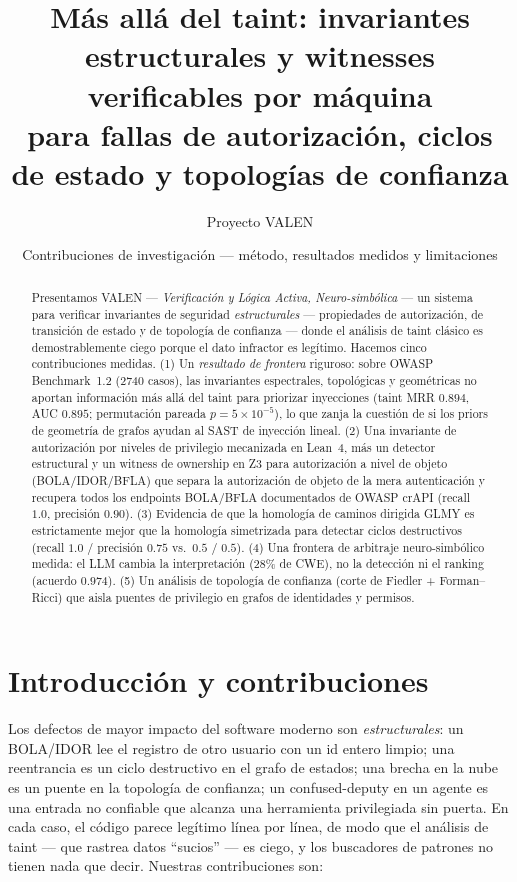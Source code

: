 \documentclass[11pt]{article}
\title{\bfseries Más allá del taint: invariantes estructurales y witnesses
verificables por máquina\\ para fallas de autorización, ciclos de estado y
topologías de confianza}
\author{Proyecto VALEN}
\date{Contribuciones de investigación --- método, resultados medidos y limitaciones}
\begin{document}
\maketitle

\begin{abstract}
\noindent Presentamos VALEN --- \emph{Verificación y Lógica Activa,
Neuro-simbólica} --- un sistema para verificar invariantes de seguridad
\emph{estructurales} --- propiedades de autorización, de transición de estado y de
topología de confianza --- donde el análisis de taint clásico es demostrablemente
ciego porque el dato infractor es legítimo. Hacemos cinco contribuciones medidas.
(1) Un \emph{resultado de frontera} riguroso: sobre OWASP Benchmark~1.2 (2740
casos), las invariantes espectrales, topológicas y geométricas no aportan
información más allá del taint para priorizar inyecciones (taint MRR $0.894$, AUC
$0.895$; permutación pareada $p=5\times10^{-5}$), lo que zanja la cuestión de si
los priors de geometría de grafos ayudan al SAST de inyección lineal. (2) Una
invariante de autorización por niveles de privilegio mecanizada en Lean~4, más un
detector estructural y un witness de ownership en Z3 para autorización a nivel de
objeto (BOLA/IDOR/BFLA) que separa la autorización de objeto de la mera
autenticación y recupera todos los endpoints BOLA/BFLA documentados de OWASP
crAPI (recall $1.0$, precisión $0.90$). (3) Evidencia de que la homología de
caminos dirigida GLMY es estrictamente mejor que la homología simetrizada para
detectar ciclos destructivos (recall $1.0$ / precisión $0.75$ vs.\ $0.5$ /
$0.5$). (4) Una frontera de arbitraje neuro-simbólico medida: el LLM cambia la
interpretación ($28\%$ de CWE), no la detección ni el ranking (acuerdo $0.974$).
(5) Un análisis de topología de confianza (corte de Fiedler + Forman--Ricci) que
aisla puentes de privilegio en grafos de identidades y permisos.
\end{abstract}

\section{Introducción y contribuciones}
Los defectos de mayor impacto del software moderno son \emph{estructurales}: un
BOLA/IDOR lee el registro de otro usuario con un id entero limpio; una
reentrancia es un ciclo destructivo en el grafo de estados; una brecha en la nube
es un puente en la topología de confianza; un confused-deputy en un agente es una
entrada no confiable que alcanza una herramienta privilegiada sin puerta. En cada
caso, el código parece legítimo línea por línea, de modo que el análisis de taint
--- que rastrea datos ``sucios'' --- es ciego, y los buscadores de patrones no
tienen nada que decir. Nuestras contribuciones son:
\end{document}
